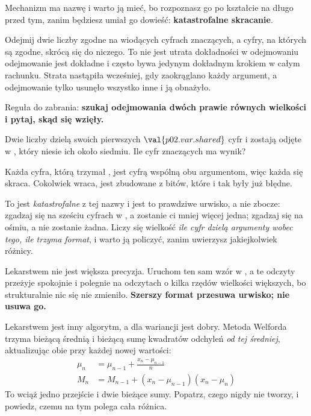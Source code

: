 \begin{fr}
Mechanizm ma nazwę i warto ją mieć, bo rozpoznasz go po kształcie na długo
przed tym, zanim będziesz umiał go dowieść: \textbf{katastrofalne skracanie}.

Odejmij dwie liczby zgodne na wiodących cyfrach znaczących, a cyfry, na których
są zgodne, skrócą się do niczego. To nie jest utrata dokładności w odejmowaniu
\dash{} odejmowanie jest dokładne i często bywa jedynym dokładnym krokiem w
całym rachunku. Strata nastąpiła wcześniej, gdy zaokrąglano każdy argument, a
odejmowanie tylko usunęło wszystko inne i ją obnażyło.

\medskip
\noindent
Reguła do zabrania: \textbf{szukaj odejmowania dwóch prawie równych wielkości i
pytaj, skąd się wzięły.}
\end{fr}


\begin{fr}
Dwie liczby dzielą swoich pierwszych $\val{p02.var.shared}$ cyfr i zostają
odjęte w , który niesie ich około siedmiu. Ile cyfr znaczących ma
wynik?
\nextframe
\end{fr}

\begin{fr}
Każda cyfra, którą trzymał , jest cyfrą wspólną obu argumentom,
więc każda się skraca. Cokolwiek wraca, jest zbudowane z bitów, które i tak
były już błędne.

To jest \emph{katastrofalne} z tej nazwy i jest to prawdziwe urwisko, a nie
zbocze: zgadzaj się na sześciu cyfrach w , a zostanie ci mniej
więcej jedna; zgadzaj się na ośmiu, a nie zostanie żadna. Liczy się wielkość
\emph{ile cyfr dzielą argumenty wobec tego, ile trzyma format}, i warto ją
policzyć, zanim uwierzysz jakiejkolwiek różnicy.
\end{fr}


\begin{fr}
Lekarstwem nie jest większa precyzja. Uruchom ten sam wzór w , a
te odczyty przeżyje spokojnie \dash{} i polegnie na odczytach o kilka rzędów
wielkości większych, bo strukturalnie nic się nie zmieniło. \textbf{Szerszy
format przesuwa urwisko; nie usuwa go.}

Lekarstwem jest inny algorytm, a dla wariancji jest dobry. Metoda Welforda
trzyma bieżącą średnią i bieżącą sumę kwadratów odchyleń \emph{od tej
średniej}, aktualizując obie przy każdej nowej wartości:
\begin{align*}
  \mu_n &= \mu_{n-1} + \frac{x_n - \mu_{n-1}}{n} \\
  M_n &= M_{n-1} + (x_n - \mu_{n-1})(x_n - \mu_n)
\end{align*}
To wciąż jedno przejście i dwie bieżące sumy. Popatrz, czego nigdy nie tworzy,
i powiedz, czemu na tym polega cała różnica.
\nextframe
\end{fr}

